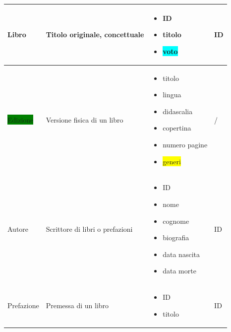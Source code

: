 \documentclass{article}
\begin{document}
\begin{center}
\begin{longtable}{|p{2cm}|p{4cm}|p{3cm}|p{2.5cm}|}
		Libro                           & Titolo originale, concettuale                                  &
		\footnotesize
		\begin{itemize}
			\item ID
			\item titolo
			\item \colorbox{cyan}{voto}
		\end{itemize} & ID                                                                                                          \\
		\hline

		\colorbox{green}{Edizione}      & Versione fisica di un libro                                    &
		\footnotesize
		\begin{itemize}
			\item titolo
			\item lingua
			\item didascalia
			\item copertina
			\item numero pagine
			\item \colorbox{yellow}{generi}
		\end{itemize}             & \begin{center}
			                            /
		                            \end{center}                                                                                               \\
		\hline

		Autore                          & Scrittore di libri o prefazioni                                &
		\footnotesize
		\begin{itemize}
			\item ID
			\item nome
			\item cognome
			\item biografia
			\item data nascita
			\item data morte
		\end{itemize}              & ID                                                                                                         \\
		\hline

		Prefazione                      & Premessa di un libro                                           &
		\footnotesize
		\begin{itemize}
			\item ID
			\item titolo
		\end{itemize}                 & ID                                                                                                      \\
		\hline


\end{longtable}
\end{center}
\end{document}
